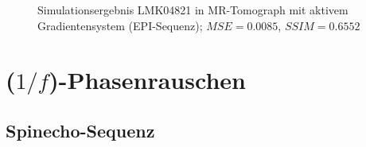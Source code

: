 \begin{figure}[H]
	\centering
	\hfill
	\caption[LMK04821 in MR-Tomograph mit aktivem Gradientensystem (EPI) (3)]{Simulationsergebnis LMK04821 in MR-Tomograph mit aktivem Gradientensystem (EPI-Sequenz); $MSE=0.0085$, $SSIM=0.6552$}
	\label{fig:resLMKepi3}	
\end{figure}






\section{($1/f$)-Phasenrauschen}

\subsection{Spinecho-Sequenz}

